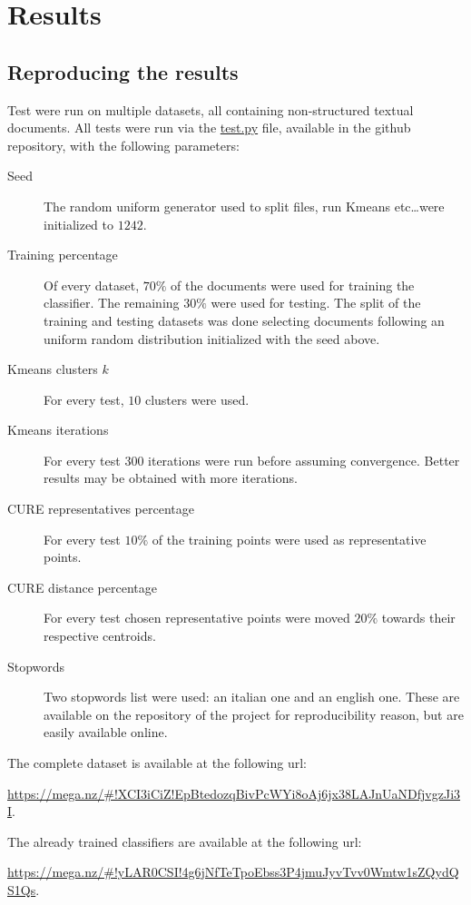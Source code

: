 \documentclass[\main/main.tex]{subfiles}
\begin{document}
\chapter{Results}
\section{Reproducing the results}
Test were run on multiple datasets, all containing non-structured textual documents. All tests were run via the \href{https://github.com/LucaCappelletti94/zipf_classifier/blob/master/tests/test_classifier.py}{test.py} file, available in the github repository, with the following parameters:
\begin{description}
	\item[Seed] The random uniform generator used to split files, run Kmeans etc\ldots were initialized to \(1242\).
	\item[Training percentage] Of every dataset, \(70\%\) of the documents were used for training the classifier. The remaining \(30\%\) were used for testing. The split of the training and testing datasets was done selecting documents following an uniform random distribution initialized with the seed above.
	\item[Kmeans clusters \(k\)] For every test, \(10\) clusters were used.
	\item[Kmeans iterations] For every test \(300\) iterations were run before assuming convergence. Better results may be obtained with more iterations.
	\item[CURE representatives percentage] For every test \(10\%\) of the training points were used as representative points.
	\item[CURE distance percentage] For every test chosen representative points were moved \(20\%\) towards their respective centroids.
	\item[Stopwords] Two stopwords list were used: an italian one and an english one. These are available on the repository of the project for reproducibility reason, but are easily available online.
\end{description}

The complete dataset is available at the following url:

\url{https://mega.nz/#!XCI3iCiZ!EpBtedozqBivPcWYi8oAj6jx38LAJnUaNDfjvgzJi3I}.

The already trained classifiers are available at the following url:

\url{https://mega.nz/#!yLAR0CSI!4g6jNfTeTpoEbss3P4jmuJyvTvv0Wmtw1sZQydQS1Qs}.
\end{document}
